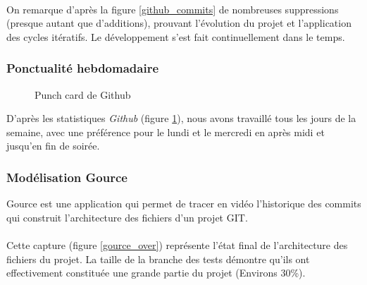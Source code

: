 \paragraph{}
On remarque d'après la figure \ref{github_commits} de nombreuses suppressions (presque autant que d’additions), prouvant l’évolution du projet et l’application des cycles itératifs. Le développement s’est fait continuellement dans le temps.

\subsubsection{Ponctualité hebdomadaire}

\begin{figure}[H]\centering
  \caption{Punch card de Github}
  \label{punchcard}
\end{figure}

D’après les statistiques \emph{Github} (figure \ref{punchcard}), nous avons travaillé tous les jours de la semaine, avec une préférence pour le lundi et le mercredi en après midi et jusqu’en fin de soirée.

\subsubsection{Modélisation Gource}

Gource est une application qui permet de tracer en vidéo l’historique des commits qui construit l’architecture des fichiers d’un projet GIT.

\paragraph{}
Cette capture (figure \ref{gource_over}) représente l’état final de l’architecture des fichiers du projet. La taille de la branche des tests démontre qu'ils ont effectivement constituée une grande partie du projet (Environs 30\%).


